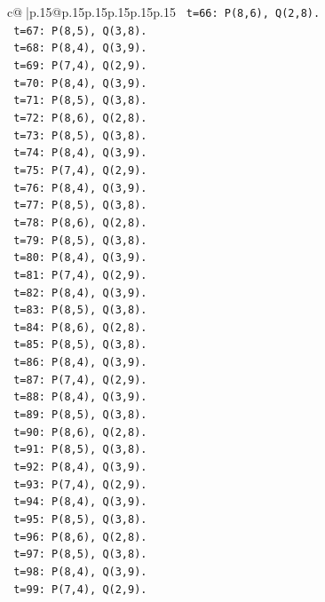 \documentclass{article}
\begin{document}
{\begin{supertabular}{c@{$\;$}|p{.15\linewidth}@{}p{.15\linewidth}p{.15\linewidth}p{.15\linewidth}p{.15\linewidth}p{.15\linewidth}}
{{{\texttt{   t=66: P(8,6), Q(2,8).} \\
\texttt{   t=67: P(8,5), Q(3,8).} \\
\texttt{   t=68: P(8,4), Q(3,9).} \\
\texttt{   t=69: P(7,4), Q(2,9).} \\
\texttt{   t=70: P(8,4), Q(3,9).} \\
\texttt{   t=71: P(8,5), Q(3,8).} \\
\texttt{   t=72: P(8,6), Q(2,8).} \\
\texttt{   t=73: P(8,5), Q(3,8).} \\
\texttt{   t=74: P(8,4), Q(3,9).} \\
\texttt{   t=75: P(7,4), Q(2,9).} \\
\texttt{   t=76: P(8,4), Q(3,9).} \\
\texttt{   t=77: P(8,5), Q(3,8).} \\
\texttt{   t=78: P(8,6), Q(2,8).} \\
\texttt{   t=79: P(8,5), Q(3,8).} \\
\texttt{   t=80: P(8,4), Q(3,9).} \\
\texttt{   t=81: P(7,4), Q(2,9).} \\
\texttt{   t=82: P(8,4), Q(3,9).} \\
\texttt{   t=83: P(8,5), Q(3,8).} \\
\texttt{   t=84: P(8,6), Q(2,8).} \\
\texttt{   t=85: P(8,5), Q(3,8).} \\
\texttt{   t=86: P(8,4), Q(3,9).} \\
\texttt{   t=87: P(7,4), Q(2,9).} \\
\texttt{   t=88: P(8,4), Q(3,9).} \\
\texttt{   t=89: P(8,5), Q(3,8).} \\
\texttt{   t=90: P(8,6), Q(2,8).} \\
\texttt{   t=91: P(8,5), Q(3,8).} \\
\texttt{   t=92: P(8,4), Q(3,9).} \\
\texttt{   t=93: P(7,4), Q(2,9).} \\
\texttt{   t=94: P(8,4), Q(3,9).} \\
\texttt{   t=95: P(8,5), Q(3,8).} \\
\texttt{   t=96: P(8,6), Q(2,8).} \\
\texttt{   t=97: P(8,5), Q(3,8).} \\
\texttt{   t=98: P(8,4), Q(3,9).} \\
\texttt{   t=99: P(7,4), Q(2,9).} \\
}}}
\end{supertabular}}
\end{document}
